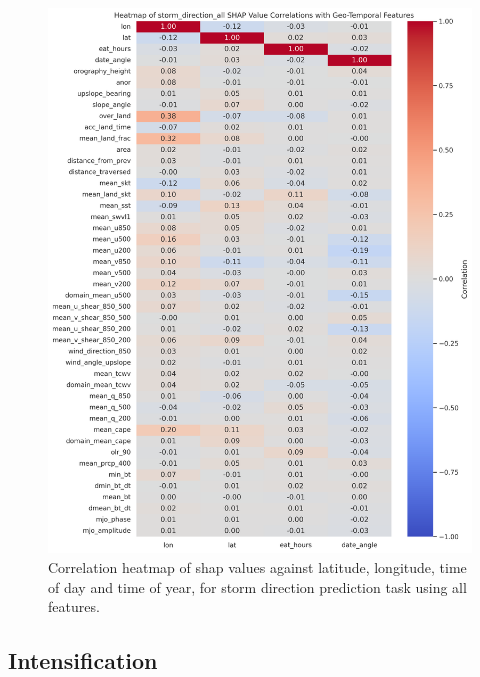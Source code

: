 \begin{figure}[ht]
    \centering
    \includegraphics[width=\textwidth]{../figures/generated/experiments/storm_direction/storm_direction_all_shap_correlation_heatmap.png}
    \caption{Correlation heatmap of \acrshort{shap} values against latitude, longitude, time of day and time of year, for storm direction prediction task using all features.}
    \label{fig:storm_direction_all_shap_heatmap}
\end{figure}

\clearpage 

\subsection{Intensification}
\label{appn:shap-heatmaps-int}

